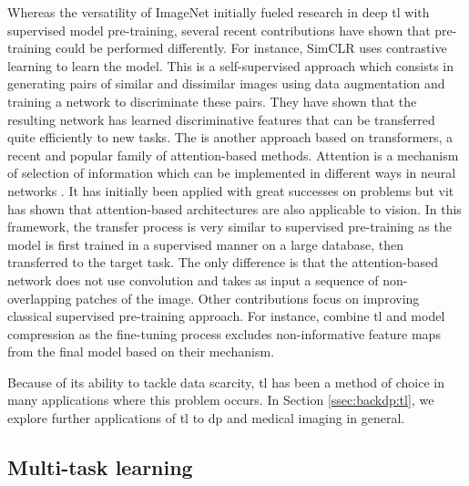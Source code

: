 Whereas the versatility of ImageNet initially fueled research in deep \acrlong{tl}
with supervised model pre-training, several recent contributions have shown that
pre-training could be performed differently. For instance, SimCLR \cite{chen2020simple}
uses contrastive learning to learn the model. This is a self-supervised approach
which consists in generating pairs of similar and dissimilar images using data
augmentation and training a network to discriminate these pairs. They have shown
that the resulting network has learned discriminative features that can be transferred
quite efficiently to new tasks. The  \cite{dosovitskiy2020image}
is another approach based on transformers, a recent and popular family of
attention-based methods. Attention is a mechanism of selection of information
which can be implemented in different ways in neural networks \cite{niu2021review}.
It has initially been applied with great successes on  problems
but \acrshort{vit} has shown that attention-based architectures are also applicable
to vision. In this framework, the transfer process is very similar to supervised
pre-training as the model is first trained in a supervised manner on a large
database, then transferred to the target task. The only difference is that the
attention-based network does not use convolution and takes as input a sequence of
non-overlapping patches of the image. Other contributions focus on improving
classical supervised pre-training approach. For instance, \cite{wang2019pay}
combine \acrlong{tl} and model compression as the fine-tuning process excludes
non-informative feature maps from the final model based on their 
mechanism.

Because of its ability to tackle data scarcity, \acrlong{tl} has been a method of
choice in many applications where this problem occurs. In Section \ref{ssec:backdp:tl},
we explore further applications of \acrlong{tl} to \acrlong{dp} and medical imaging
in general.

\subsection{Multi-task learning}
\label{ssec:backml:dl:deepmultitask}

